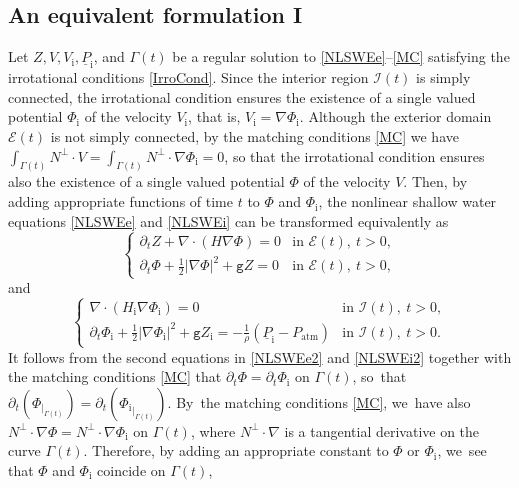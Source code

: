\documentclass[11pt]{article}
\newcommand{\gr}{{\mathtt g}}
\newcommand{\dt}{\partial_t}
\newcommand{\cI}{{\mathcal I}}
\newcommand{\cE}{{\mathcal E}}
\newcommand{\ul}[1]{\underline{#1}}
\newcommand{\itGamma}{\mathit{\Gamma}}
\theoremstyle{definition}
\begin{document}
\subsection{An equivalent formulation I}\label{subsect:EF1}
Let $Z,V,V_\mathrm{i},\ul{P}_\mathrm{i}$, and $\itGamma(t)$ be a regular solution to \eqref{NLSWEe}--\eqref{MC} satisfying the irrotational conditions \eqref{IrroCond}.
Since the interior region $\cI(t)$ is simply connected, the irrotational condition ensures the existence of a single valued potential $\Phi_\mathrm{i}$
of the velocity $V_\mathrm{i}$, that is, $V_\mathrm{i}=\nabla\Phi_\mathrm{i}$.
Although the exterior domain $\cE(t)$ is not simply connected, by the matching conditions \eqref{MC} we have
$\int_{\itGamma(t)}N^\perp\cdot V=\int_{\itGamma(t)}N^\perp\cdot\nabla\Phi_\mathrm{i}=0$,
so that the irrotational condition ensures also the existence of a single valued potential $\Phi$ of the velocity $V$.
Then, by adding appropriate functions of time $t$ to $\Phi$ and $\Phi_\mathrm{i}$,
the nonlinear shallow water equations \eqref{NLSWEe} and \eqref{NLSWEi} can be transformed equivalently as
\begin{equation}\label{NLSWEe2}
\begin{cases}
\dt Z+\nabla\cdot(H\nabla\Phi)=0 &\text{in } \cE(t), \ t>0, \\
\dt\Phi + \frac12|\nabla\Phi|^2 + \gr Z = 0 &\text{in } \cE(t), \ t>0,
\end{cases}
\end{equation}
and
\begin{equation}\label{NLSWEi2}
\begin{cases}
\nabla\cdot(H_\mathrm{i}\nabla\Phi_\mathrm{i})=0 &\text{in } \cI(t), \ t>0, \\
\dt\Phi_\mathrm{i} + \frac12|\nabla\Phi_\mathrm{i}|^2 + \gr Z_\mathrm{i} = -\frac{1}{\rho}(\ul{P}_\mathrm{i}-P_\mathrm{atm}) &\text{in } \cI(t), \ t>0.
\end{cases}
\end{equation}
It follows from the second equations in \eqref{NLSWEe2} and \eqref{NLSWEi2} together with the matching conditions \eqref{MC} that
$\dt\Phi=\dt\Phi_\mathrm{i}$ on $\itGamma(t)$, so~that $\dt(\Phi_{\vert_{\itGamma(t)}})=\dt({ \Phi_\mathrm{i} }_{\vert_{\itGamma(t)}})$. By~the matching conditions \eqref{MC}, we~have also $N^\perp\cdot\nabla\Phi=N^\perp\cdot\nabla\Phi_\mathrm{i}$ on $\itGamma(t)$,
where $N^\perp\cdot\nabla$ is a tangential derivative on the curve $\itGamma(t)$.
Therefore, by adding an appropriate constant to $\Phi$ or $\Phi_\mathrm{i}$, we~see that $\Phi$ and $\Phi_\mathrm{i}$ coincide on $\itGamma(t)$,
\end{document}
